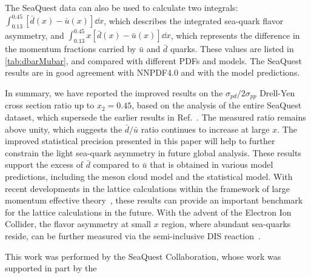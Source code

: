 \documentclass[reprint,aps,unsortedaddress,superscriptaddress,prl,floatfix,showpacs,linenumbers]{revtex4-2}
\begin{document}
The SeaQuest data can also be used to calculate two integrals: 
$\int^{0.45}_{0.13} \left[\bar{d}\left(x\right) - \bar{u}\left(x\right) \right]\dd{x}$,
which describes the integrated sea-quark flavor asymmetry, and 
$\int^{0.45}_{0.13} x\left[\bar{d}\left(x\right) - \bar{u}\left(x\right) \right]\dd{x}$,
which represents the difference in the momentum fractions carried 
by $\bar{u}$ and $\bar{d}$ quarks.
These values are listed in \cref{tab:dbarMubar}, and compared with different PDFs and models.
The SeaQuest results are in good agreement with NNPDF4.0 and with the model predictions.

In summary, we have reported the improved results on the 
$\sigma_{pd}/2\sigma_{pp}$ Drell-Yen cross section ratio up to $x_2=0.45$,
based on the analysis of the entire SeaQuest dataset,
which supersede the earlier results in Ref.~\cite{dove2021,dove2023}.
The measured ratio remains above unity, 
which suggests the $\bar{d}/\bar{u}$ ratio continues to increase at large $x$.
The improved statistical precision presented in this paper will help to 
further constrain the light sea-quark asymmetry in future global analysis.
These results support the excess of $\bar{d}$ compared to $\bar{u}$ that is obtained in various model predictions,
including the meson cloud model and the statistical model.
With recent developments in the lattice calculations within the framework 
of large momentum effective theory~\cite{constantinou2021},
these results can provide an important benchmark for the lattice 
calculations in the future.
With the advent of the Electron Ion Collider, the flavor asymmetry at small $x$ region,
where abundant sea-quarks reside, can be further measured via the semi-inclusive DIS reaction~\cite{ackerstaff1998}.

\begin{acknowledgments}
	This work was performed by the SeaQuest Collaboration, whose work was supported in part by the
\end{acknowledgments}

\end{document}

